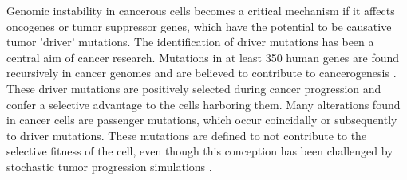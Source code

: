     Genomic instability in cancerous cells becomes a critical mechanism if it
    affects oncogenes or tumor suppressor genes, which have the potential to
    be causative tumor 'driver' mutations. The identification of driver
    mutations has been a central aim of cancer research. Mutations in at least
    350 human genes are found recursively in cancer genomes and are believed
    to contribute to cancerogenesis {\cite{cancer_genome}}. These driver
    mutations are positively selected during cancer progression and confer a
    selective advantage to the cells harboring them. Many alterations found in
    cancer cells are passenger mutations, which occur coincidally or
    subsequently to driver mutations. These mutations are defined to not
    contribute to the selective fitness of the cell, even though this
    conception has been challenged by stochastic tumor progression simulations
    {\cite{stochastic_cancer}}.

